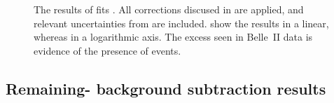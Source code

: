 \begin{figure}[htbp!]
    \centering
    \caption{\label{fig:final_fit_results}
        The results of fits .
        All corrections discused in  are applied, 
        and relevant uncertainties from  are included.
         show the results in a linear, whereas  in a logarithmic axis.
        The excess seen in Belle~II data is evidence of the presence of \BtoXsdgamma events.
    }
\end{figure}

\subsection{Remaining-\texorpdfstring{\BB}{BB} background subtraction results}\label{sec:background_subtraction_results}

